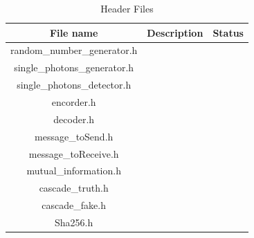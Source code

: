 \begin{table}[H]
\centering
\caption{Header Files}
\label{tab:headerfiles}
\begin{tabular}{|c|c|c|}
\hline
\textbf{File name}           & \textbf{Description}  & \textbf{Status}       \\ \hline
random\_number\_generator.h  &                       &                       \\ \hline
single\_photons\_generator.h &                       &                       \\ \hline
single\_photons\_detector.h  &                       &                       \\ \hline
encorder.h                   &                       &                       \\ \hline
decoder.h                    &                       &                       \\ \hline
message\_toSend.h              &                       &                       \\ \hline
message\_toReceive.h           &                       &                       \\ \hline
mutual\_information.h        &                       &                       \\ \hline
cascade\_truth.h               &                       &                       \\ \hline
cascade\_fake.h                &                       &                       \\ \hline
Sha256.h                     &                       &                       \\ \hline
\end{tabular}
\end{table}

